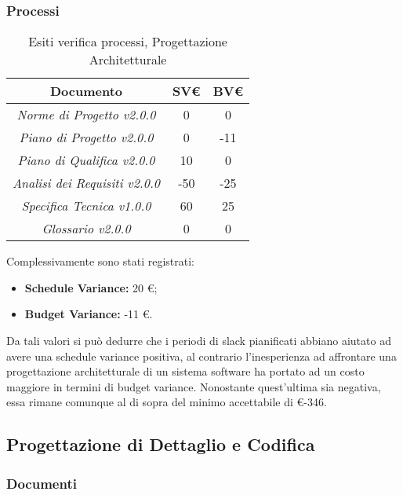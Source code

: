 \subsubsection{Processi}
\label{appendice 4}
\vspace{3mm}

\begin{table}[h]
	\begin{tabular}{|c|c|c|}
		\toprule
			\textbf{Documento} & \textbf{SV\euro} & \textbf{BV\euro} \\ 
		\midrule
		\midrule
			\textit{Norme di Progetto v2.0.0} & 0 & 0 \\  
			\textit{Piano di Progetto v2.0.0} & 0 & -11 \\ 
			\textit{Piano di Qualifica v2.0.0} & 10 & 0 \\ 
			\textit{Analisi dei Requisiti v2.0.0} & -50 & -25 \\
			\textit{Specifica Tecnica v1.0.0} & 60 & 25 \\ 
			\textit{Glossario v2.0.0} & 0 & 0 \\ 
		\bottomrule
	\end{tabular}
\caption{Esiti verifica processi, Progettazione Architetturale}
\end{table}

\noindent Complessivamente sono stati registrati:
\begin{itemize}
	\item \textbf{Schedule Variance:} 20 \euro;
	\item \textbf{Budget Variance:} -11 \euro.
\end{itemize}

\noindent Da tali valori si può dedurre che i periodi di slack pianificati abbiano aiutato ad avere una schedule variance positiva, al contrario l'inesperienza ad affrontare una progettazione architetturale di un sistema software ha portato ad un costo maggiore in termini di budget variance. Nonostante quest'ultima sia negativa, essa rimane comunque al di sopra del minimo accettabile di \euro -346.

\newpage

\subsection{Progettazione di Dettaglio e Codifica}
\subsubsection{Documenti}
\label{appendice 5}

